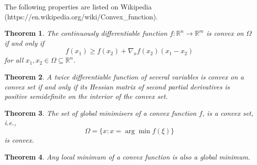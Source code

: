 \documentclass{article}
\newtheorem{theorem}{Theorem}[section]
\begin{document}
The following properties are listed on Wikipedia (https://en.wikipedia.org/wiki/Convex\_function).
\begin{theorem}
The continuously differentiable function $f:\mathbb{R}^n \to \mathbb{R}^m$ is convex on $\Omega$ if and only if
\[
f(x_1) \geq f(x_2) + \nabla_x f(x_2) (x_1-x_2)
\]
for all $x_1, x_2\in\Omega\subseteq\mathbb{R}^n$.
\end{theorem}
\begin{theorem}
A twice differentiable function of several variables is convex on a convex set if and only if its Hessian matrix of second partial derivatives is positive semidefinite on the interior of the convex set.	
\end{theorem}
\begin{theorem}
The set of global minimisers of a convex function $f$, is a convex set, i.e.,
\[
\Omega = \{x: x=\arg\min f(\xi)\}
\]
is convex.
\end{theorem}
\begin{theorem}
Any local minimum of a convex function is also a global minimum.	
\end{theorem}
\end{document}
